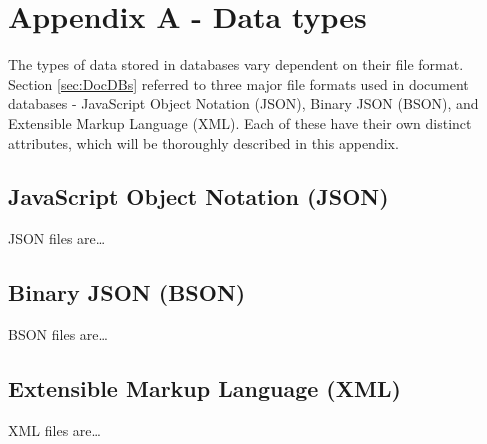 \begingroup
\renewcommand\thechapter{A}
\titleformat{\chapter}[display]
{\normalfont\huge\bfseries}{}{20pt}{\Huge}
\setcounter{section}{0}
\setcounter{figure}{0} 

\chapter*{Appendix A - Data types}

The types of data stored in databases vary dependent on their file format. Section \ref{sec:DocDBs} referred to three 
major file formats used in document databases - JavaScript Object Notation (JSON), Binary JSON (BSON), and Extensible Markup Language (XML).
Each of these have their own distinct attributes, which will be thoroughly described in this appendix.

\section{JavaScript Object Notation (JSON)}
JSON files are\dots

\section{Binary JSON (BSON)}
BSON files are\dots

\section{Extensible Markup Language (XML)}
XML files are\dots

\endgroup